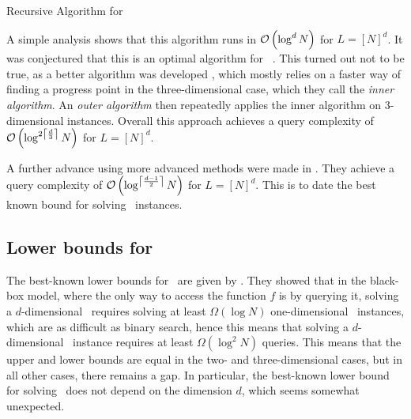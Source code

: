 \begin{algorithm}
	\caption{Recursive Algorithm for \Tarski}
	\label{alg:recursive_tarski_solver}
\end{algorithm}

A simple analysis shows that this algorithm runs in $\mathcal{O}\left(\log^{d}{N}\right)$ for $L = [N]^d$. It was conjectured that this is an optimal algorithm for \Tarski\ . This turned out not to be true, as a better algorithm was developed , which mostly relies on a faster way of finding a progress point in the three-dimensional case, which they call the \emph{inner algorithm}. An \emph{outer algorithm} then repeatedly applies the inner algorithm on 3-dimensional instances. Overall this approach achieves a query complexity of $\mathcal{O}\left(\log^{2\left\lceil\frac{d}{3}\right\rceil}{N}\right)$ for $L = [N]^d$.

A further advance using more advanced methods were made in . They achieve a query complexity of $\mathcal{O}\left(\log^{\left\lceil\frac{d-1}{2}\right\rceil}{N}\right)$ for $L = [N]^d$. This is to date the best known bound for solving \Tarski\ instances.

\subsection{Lower bounds for \Tarski}

The best-known lower bounds for \Tarski\ are given by . They showed that in the black-box model, where the only way to access the function $f$ is by querying it, solving a $d$-dimensional \Tarski\ requires solving at least $\Omega(\log{N})$ one-dimensional \Tarski\ instances, which are as difficult as binary search, hence this means that solving a $d$-dimensional \Tarski\ instance requires at least $\Omega(\log^{2}{N})$ queries. This means that the upper and lower bounds are equal in the two- and three-dimensional cases, but in all other cases, there remains a gap. In particular, the best-known lower bound for solving \Tarski\ does not depend on the dimension $d$, which seems somewhat unexpected.

